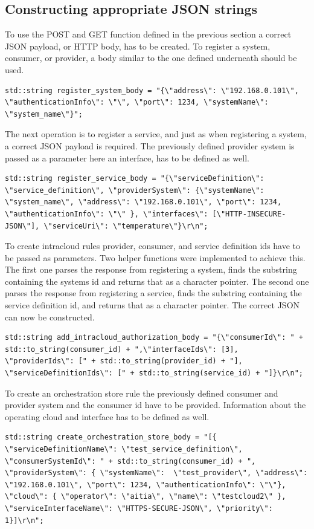 \subsection{Constructing appropriate JSON strings}
To use the POST and GET function defined in the previous section a correct JSON payload, or HTTP body, has to be created.
To register a system, consumer, or provider, a body similar to the one defined underneath should be used.
\begin{lstlisting}[style=CStyle]
    std::string register_system_body = "{\"address\": \"192.168.0.101\", \"authenticationInfo\": \"\", \"port\": 1234, \"systemName\": \"system_name\"}";
\end{lstlisting}
The next operation is to register a service, and just as when registering a system, a correct JSON payload is required.
The previously defined provider system is passed as a parameter here an interface, has to be defined as well.
\begin{lstlisting}[style=CStyle]
    std::string register_service_body = "{\"serviceDefinition\": \"service_definition\", \"providerSystem\": {\"systemName\": \"system_name\", \"address\": \"192.168.0.101\", \"port\": 1234, \"authenticationInfo\": \"\" }, \"interfaces\": [\"HTTP-INSECURE-JSON\"], \"serviceUri\": \"temperature\"}\r\n";
\end{lstlisting}
To create intracloud rules provider, consumer, and service definition ids have to be passed as parameters.
Two helper functions were implemented to achieve this.
The first one parses the response from registering a system, finds the substring containing the systems id and returns that as a character pointer.
The second one parses the response from registering a service, finds the substring containing the service definition id, and returns that as a character pointer.
The correct JSON can now be constructed.
\begin{lstlisting}[style=CStyle]
    std::string add_intracloud_authorization_body = "{\"consumerId\": " + std::to_string(consumer_id) + ",\"interfaceIds\": [3], \"providerIds\": [" + std::to_string(provider_id) + "], \"serviceDefinitionIds\": [" + std::to_string(service_id) + "]}\r\n";
\end{lstlisting}
To create an orchestration store rule the previously defined consumer and provider system and the consumer id have to be provided. 
Information about the operating cloud and interface has to be defined as well.
\begin{lstlisting}[style=CStyle]
std::string create_orchestration_store_body = "[{ \"serviceDefinitionName\": \"test_service_definition\", \"consumerSystemId\": " + std::to_string(consumer_id) + ", \"providerSystem\": { \"systemName\":  \"test_provider\", \"address\": \"192.168.0.101\", \"port\": 1234, \"authenticationInfo\": \"\"}, \"cloud\": { \"operator\": \"aitia\", \"name\": \"testcloud2\" }, \"serviceInterfaceName\": \"HTTPS-SECURE-JSON\", \"priority\": 1}]\r\n";
\end{lstlisting}
